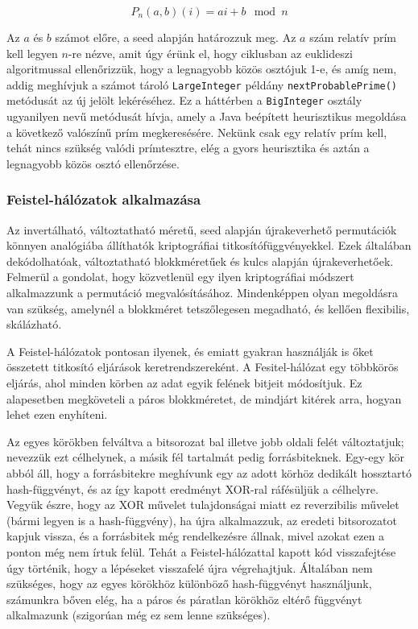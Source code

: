 \documentclass[
    parspace,
    noindent,
    nohyp,
]{elteiktdk}[2023/04/10]
\begin{document}
$$
P_n(a,b)(i) = ai + b \mod n
$$

Az $a$ és $b$ számot előre, a seed alapján határozzuk meg.
Az $a$ szám relatív prím kell legyen $n$-re nézve, amit úgy érünk el, hogy ciklusban az euklideszi algoritmussal ellenőrizzük, hogy a legnagyobb közös osztójuk 1-e,
és amíg nem, addig meghívjuk a számot tároló \texttt{LargeInteger} példány \texttt{nextProbablePrime()} metódusát az új jelölt lekéréséhez.
Ez a háttérben a \texttt{BigInteger} osztály ugyanilyen nevű metódusát hívja, amely a Java beépített heurisztikus megoldása a következő valószínű prím megkeresésére.
Nekünk csak egy relatív prím kell, tehát nincs szükség valódi prímtesztre, elég a gyors heurisztika és aztán a legnagyobb közös osztó ellenőrzése.

\subsubsection{Feistel-hálózatok alkalmazása}

Az invertálható, változtatható méretű, seed alapján újrakeverhető permutációk könnyen analógiába állíthatók kriptográfiai titkosítófüggvényekkel.
Ezek általában dekódolhatóak, változtatható blokkméretűek és kulcs alapján újrakeverhetőek.
Felmerül a gondolat, hogy közvetlenül egy ilyen kriptográfiai módszert alkalmazzunk a permutáció megvalósításához.
Mindenképpen olyan megoldásra van szükség, amelynél a blokkméret tetszőlegesen megadható, és kellően flexibilis, skálázható.

A Feistel-hálózatok pontosan ilyenek, és emiatt gyakran használják is őket összetett titkosító eljárások keretrendszereként.
A Fesitel-hálózat egy többkörös eljárás, ahol minden körben az adat egyik felének bitjeit módosítjuk.
Ez alapesetben megköveteli a páros blokkméretet, de mindjárt kitérek arra, hogyan lehet ezen enyhíteni.

Az egyes körökben felváltva a bitsorozat bal illetve jobb oldali felét változtatjuk; nevezzük ezt célhelynek, a másik fél tartalmát pedig forrásbiteknek.
Egy-egy kör abból áll, hogy a forrásbitekre meghívunk egy az adott körhöz dedikált hossztartó hash-függvényt,
és az így kapott eredményt XOR-ral ráfésüljük a célhelyre.
Vegyük észre, hogy az XOR művelet tulajdonságai miatt ez reverzibilis művelet (bármi legyen is a hash-függvény),
ha újra alkalmazzuk, az eredeti bitsorozatot kapjuk vissza,
és a forrásbitek még rendelkezésre állnak, mivel azokat ezen a ponton még nem írtuk felül.
Tehát a Feistel-hálózattal kapott kód visszafejtése úgy történik, hogy a lépéseket visszafelé újra végrehajtjuk.
Általában nem szükséges, hogy az egyes körökhöz különböző hash-függvényt használjunk,
számunkra bőven elég, ha a páros és páratlan körökhöz eltérő függvényt alkalmazunk (szigorúan még ez sem lenne szükséges).
\end{document}
